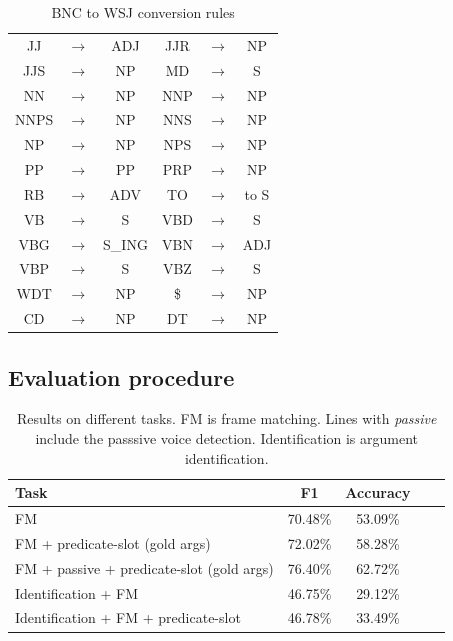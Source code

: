 \begin{table}[hb]
    \centering
    \begin{tabular}{ccc|ccc}
        \toprule
        JJ   &$\to$& ADJ    & JJR  &$\to$& NP     \\
        JJS  &$\to$& NP     & MD   &$\to$& S      \\
        NN   &$\to$& NP     & NNP  &$\to$& NP     \\
        NNPS &$\to$& NP     & NNS  &$\to$& NP     \\
        NP   &$\to$& NP     & NPS  &$\to$& NP     \\
        PP   &$\to$& PP     & PRP  &$\to$& NP     \\  
        RB   &$\to$& ADV    & TO   &$\to$& to S   \\
        VB   &$\to$& S      & VBD  &$\to$& S      \\
        VBG  &$\to$& S\_ING & VBN  &$\to$& ADJ    \\
        VBP  &$\to$& S      & VBZ  &$\to$& S      \\
        WDT  &$\to$& NP     & \$   &$\to$& NP     \\  
        CD   &$\to$& NP     & DT   &$\to$& NP     \\
        \bottomrule
    \end{tabular}
    \caption{\protect\centering\label{table:tagset_rules}BNC to WSJ conversion rules}
\end{table}


\subsection{Evaluation procedure}

\begin{table}[t!]
    \centering
    \begin{tabular}{lcccc}
        \toprule
        Task                                           & F1        & Accuracy \\
        \midrule
        FM                                             & 70.48\%   & 53.09\%  \\
        FM + predicate-slot (gold args)                & 72.02\%   & 58.28\%  \\
        FM + passive + predicate-slot (gold args)      & 76.40\%   & 62.72\%  \\
        \midrule
        Identification + FM                            & 46.75\%   & 29.12\%  \\
        Identification + FM + predicate-slot           & 46.78\%   & 33.49\%  \\
        \bottomrule
    \end{tabular}
    \caption{\protect\centering\label{table:results}Results on different tasks. FM is frame matching. Lines with \emph{passive} include the passsive voice detection. Identification is argument identification.}
\end{table}

